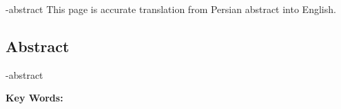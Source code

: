 
\en-abstract{
This page is accurate translation from Persian abstract into English.
}

\newpage
\thispagestyle{empty}
\begin{latin}
\section*{\LARGE\centering Abstract}

\een-abstract

\vspace*{.5cm}
{\large\textbf{Key Words:}}\par
\vspace*{.5cm}
\elatinkeywords
\end{latin}